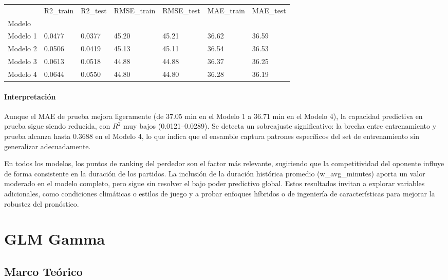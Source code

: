 \documentclass[
  letterpaper,
  DIV=11,
  numbers=noendperiod]{scrartcl}
\let\oldparagraph\paragraph
\renewcommand{\paragraph}[1]{\oldparagraph{#1}\mbox{}}
\begin{document}
\begin{longtable}[]{@{}lllllll@{}}
\toprule\noalign{}
& R2\_train & R2\_test & RMSE\_train & RMSE\_test & MAE\_train &
MAE\_test \\
Modelo & & & & & & \\
\midrule\noalign{}
\endhead
\bottomrule\noalign{}
\endlastfoot
Modelo 1 & 0.0477 & 0.0377 & 45.20 & 45.21 & 36.62 & 36.59 \\
Modelo 2 & 0.0506 & 0.0419 & 45.13 & 45.11 & 36.54 & 36.53 \\
Modelo 3 & 0.0613 & 0.0518 & 44.88 & 44.88 & 36.37 & 36.25 \\
Modelo 4 & 0.0644 & 0.0550 & 44.80 & 44.80 & 36.28 & 36.19 \\
\end{longtable}

\hypertarget{interpretaciuxf3n}{%
\paragraph{Interpretación}\label{interpretaciuxf3n}}

Aunque el MAE de prueba mejora ligeramente (de 37.05 min en el Modelo 1
a 36.71 min en el Modelo 4), la capacidad predictiva en prueba sigue
siendo reducida, con \(R^2\) muy bajos (0.0121--0.0289). Se detecta un
sobreajuste significativo: la brecha entre entrenamiento y prueba
alcanza hasta 0.3688 en el Modelo 4, lo que indica que el ensamble
captura patrones específicos del set de entrenamiento sin generalizar
adecuadamente.

En todos los modelos, los puntos de ranking del perdedor son el factor
más relevante, sugiriendo que la competitividad del oponente influye de
forma consistente en la duración de los partidos. La inclusión de la
duración histórica promedio (w\_avg\_minutes) aporta un valor moderado
en el modelo completo, pero sigue sin resolver el bajo poder predictivo
global. Estos resultados invitan a explorar variables adicionales, como
condiciones climáticas o estilos de juego y a probar enfoques híbridos o
de ingeniería de características para mejorar la robustez del
pronóstico.

\hypertarget{glm-gamma}{%
\section{GLM Gamma}\label{glm-gamma}}

\hypertarget{marco-teuxf3rico-2}{%
\subsection{Marco Teórico}\label{marco-teuxf3rico-2}}
\end{document}
